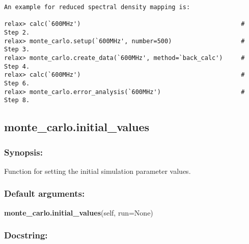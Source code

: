 {\begin{verbatim}
An example for reduced spectral density mapping is:

relax> calc(`600MHz')                                            # Step 2.
relax> monte_carlo.setup(`600MHz', number=500)                   # Step 3.
relax> monte_carlo.create_data(`600MHz', method=`back_calc')     # Step 4.
relax> calc(`600MHz')                                            # Step 6.
relax> monte_carlo.error_analysis(`600MHz')                      # Step 8.
\end{verbatim}
}



\newpage

\subsection{monte\_carlo.initial\_values}


\subsubsection{Synopsis:}

Function for setting the initial simulation parameter values.

\subsubsection{Default arguments:}

\textsf{\textbf{monte\_carlo.initial\_values}(self, run=None)
}


\subsubsection{Docstring:}


